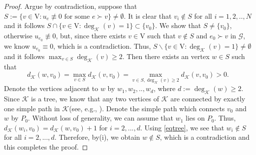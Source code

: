 \documentclass[11pt]{amsart}
\newcommand{\G}{\mathcal{G}}
\newcommand{\K}{\mathcal{K}}
\numberwithin{equation}{section}
\begin{document}
\begin{proof}
 Argue by contradiction, suppose that $S:=\{ v \in \mathrm{V}: u_e\not\equiv 0 \text{ for some }e\succ v\} \neq \emptyset$. It is clear that $v_i\not\in S$ for all $i=1,2,..,N$ and it follows $S\cap \{v\in\mathrm{V}:\operatorname{deg}_\K(v) = 1\} \subset \{v_0\}$. We show that $S\neq \{v_0\}$, otherwise $u_{e_0} \not \equiv 0$, but, since there exists $v \in \mathrm{V}$ such that $v\not \in S$ and $e_0\succ v$ in $\G$, we know $u_{e_0}\equiv 0$, which is a contradiction.  Thus, $S\backslash \{v\in\mathrm{V}:\operatorname{deg}_\K(v) = 1\} \neq \emptyset$ and it follows $\max_{v\in S}\operatorname{deg}_\K(v)\geq 2$. Then there exists an vertex $w \in S$ such that
 \begin{equation}\label{eqtree}
     d_\K(w,v_0)=\max_{v\in S}d_\K(v,v_0)=\max_{v\in S, \operatorname{deg}_\K(v)\geq2}d_\K(v,v_0) >0.
 \end{equation}
 Denote the vertices adjacent to $w$ by $w_1,w_2,..,w_d$, where $d:=\operatorname{deg}_\K(w)\geq2$. Since $\K$ is a tree, we know that any two vertices of $\K$ are connected by exactly one simple path in $\K$(see, e.g., \cite[Proposition 4.1]{Bon}). Denote the simple path which connects $v_0$ and $w$ by $P_{0}$. Without loss of generality, we can assume that $w_1$ lies on $P_0$. Thus,  $d_\K(w_i,v_0)= d_\K(w,v_0)+1$ for $i=2,...,d$. Using \eqref{eqtree}, we see that $w_i\not \in S$ for all $i=2,...,d$. Therefore, by(i), we obtain $w \not \in S$, which is a contradiction and this completes the proof.



\end{proof}
\end{document}

